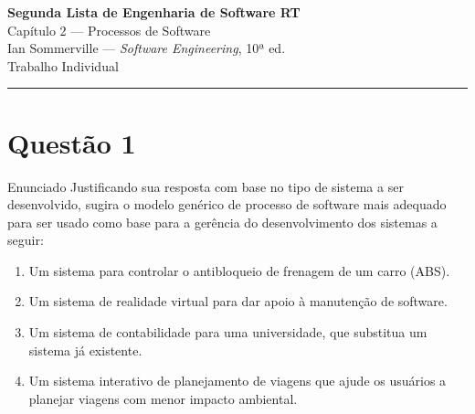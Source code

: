 \documentclass[12pt,a4paper]{article}
\begin{document}
\begin{center}
  {\Large\bfseries Segunda Lista de Engenharia de Software RT}\\[6pt]
  {\large Capítulo 2 — Processos de Software}\\[4pt]
  {\normalsize Ian Sommerville — \textit{Software Engineering}, 10ª ed.}\\[2pt]
  {\small Trabalho Individual}
\end{center}
\hrule\vspace{8pt}

\section*{Questão 1}

\begin{questao}{Enunciado}
Justificando sua resposta com base no tipo de sistema a ser desenvolvido,
sugira o modelo genérico de processo de software mais adequado para ser
usado como base para a gerência do desenvolvimento dos sistemas a seguir:
\begin{enumerate}[label=\alph*.]
  \item Um sistema para controlar o antibloqueio de frenagem de um carro (ABS).
  \item Um sistema de realidade virtual para dar apoio à manutenção de software.
  \item Um sistema de contabilidade para uma universidade, que substitua um sistema já existente.
  \item Um sistema interativo de planejamento de viagens que ajude os usuários a
        planejar viagens com menor impacto ambiental.
\end{enumerate}
\end{questao}
\end{document}
